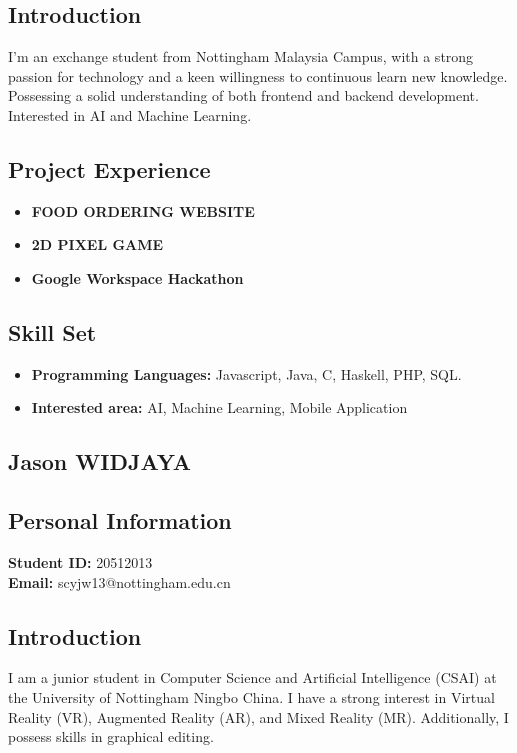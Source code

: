 \documentclass[a4paper,12pt]{article}
\begin{document}
    \subsection*{Introduction}
    I'm an exchange student from Nottingham Malaysia Campus,  with a strong passion for technology and a keen willingness to continuous learn new knowledge. Possessing a solid understanding of both frontend and backend development. Interested in AI and Machine Learning.
    
    \subsection*{Project Experience}
    \begin{itemize}
    \item \textbf {FOOD ORDERING WEBSITE}
    \item \textbf {2D PIXEL GAME}
    \item \textbf {Google Workspace Hackathon}
    \end{itemize}
    \subsection*{Skill Set}
    \begin{itemize}
        \item \textbf{Programming Languages:} Javascript, Java, C, Haskell, PHP, SQL.
        \item \textbf{Interested area:} AI, Machine Learning, Mobile Application
    \end{itemize}
    \subsection{Jason WIDJAYA}
    \subsection*{Personal Information}
    \textbf{Student ID:} 20512013 \\
    \textbf{Email:} scyjw13@nottingham.edu.cn
    
    \subsection*{Introduction}
    I am a junior student in Computer Science and Artificial Intelligence (CSAI) at the University of Nottingham
    Ningbo China. I have a strong interest in Virtual Reality (VR), Augmented Reality (AR), and Mixed Reality
    (MR). Additionally, I possess skills in graphical editing.
    
\end{document}
